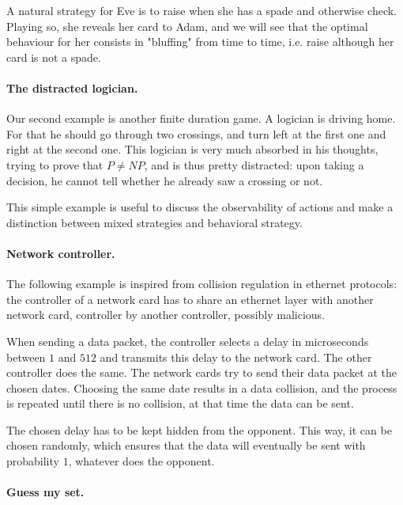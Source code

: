 A natural strategy for Eve is to raise when she has a spade and otherwise
check. Playing so, she reveals her card to Adam,
and we will see that the optimal behaviour for her
consists in "bluffing" from time to time,
i.e. raise although her card is not a spade.

\paragraph{The distracted logician.}

Our second example is another finite duration game.
A logician is driving home. For that he should go through two crossings,
and turn left at the first one and right at the second one.
This logician is very much absorbed in his thoughts,
trying to prove that $P\neq NP$,
and is thus pretty distracted: upon taking a decision, he cannot  tell
whether he already saw a crossing or not.

This simple example is useful to discuss the observability of actions
and make a distinction between
mixed strategies and behavioral strategy.
 
 \paragraph{Network controller.}
The following example is inspired from collision regulation
in ethernet protocols: the controller of a network card
has to share an ethernet layer with
another network card, controller by another controller,
possibly malicious.

When sending a data packet,
the controller selects a delay in microseconds between $1$ and $512$
and transmits this delay to the network card.
The other controller does the same.
The network cards try to send their data packet at the chosen dates.
Choosing the same date results in a data collision, and the process is repeated until
there is no collision, at that time the data can be sent.

The chosen delay has to be kept hidden from the opponent.
This way, it can be chosen randomly,
which ensures that the data will eventually be sent with probability $1$,
whatever does the opponent.
 
 
\paragraph{Guess my set.}

